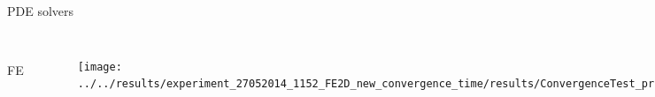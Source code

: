 \documentclass[12pt,a4paper, xcolor={usenames,dvipsnames,svgnames,table}]{beamer}
\begin{document}
\begin{frame}[shrink]{PDE solvers}
\begin{columns}
\vspace{5pt} \\FE
 \begin{figure}[h!]
 \centering
  \texttt{[image: ../../results/experiment\_27052014\_1152\_FE2D\_new\_convergence\_time/results/ConvergenceTest\_pretty.eps]}
 \end{figure}
 \begin{figure}[h!]
 \centering
  \includegraphics[width=0.8\textwidth]{../Figures/exact_numerical_1d_n130.eps}
 \end{figure}
\end{columns}

\end{frame}
\notetoself{}
\end{document}
